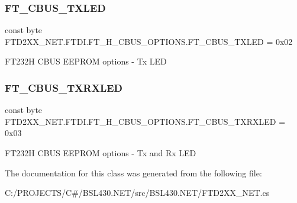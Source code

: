 \subsubsection{\texorpdfstring{FT\_CBUS\_TXLED}{FT\_CBUS\_TXLED}}
{\footnotesize\ttfamily const byte F\+T\+D2\+X\+X\+\_\+\+N\+E\+T.\+F\+T\+D\+I.\+F\+T\+\_\+H\+\_\+\+C\+B\+U\+S\+\_\+\+O\+P\+T\+I\+O\+N\+S.\+F\+T\+\_\+\+C\+B\+U\+S\+\_\+\+T\+X\+L\+ED = 0x02}



F\+T232H C\+B\+US E\+E\+P\+R\+OM options -\/ Tx L\+ED 

\mbox{\label{class_f_t_d2_x_x___n_e_t_1_1_f_t_d_i_1_1_f_t__232_h___c_b_u_s___o_p_t_i_o_n_s_a6f140d9980ac5ba097304a39f41d4a67}} 
\subsubsection{\texorpdfstring{FT\_CBUS\_TXRXLED}{FT\_CBUS\_TXRXLED}}
{\footnotesize\ttfamily const byte F\+T\+D2\+X\+X\+\_\+\+N\+E\+T.\+F\+T\+D\+I.\+F\+T\+\_\+H\+\_\+\+C\+B\+U\+S\+\_\+\+O\+P\+T\+I\+O\+N\+S.\+F\+T\+\_\+\+C\+B\+U\+S\+\_\+\+T\+X\+R\+X\+L\+ED = 0x03}



F\+T232H C\+B\+US E\+E\+P\+R\+OM options -\/ Tx and Rx L\+ED 



The documentation for this class was generated from the following file\+:\begin{DoxyCompactItemize}
\item 
C\+:/\+P\+R\+O\+J\+E\+C\+T\+S/\+C\#/\+B\+S\+L430.\+N\+E\+T/src/\+B\+S\+L430.\+N\+E\+T/F\+T\+D2\+X\+X\+\_\+\+N\+E\+T.\+cs\end{DoxyCompactItemize}
